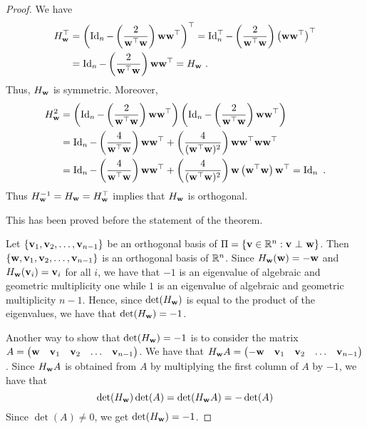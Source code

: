 \begin{proof}
 We have
\begin{align*}
  H_{\mathbf{w}}^\top &=
\left(\operatorname{Id}_n - \left(\frac{2}{\mathbf{w}^\top \mathbf{w}}\right)
  \mathbf{w} \mathbf{w}^\top \right)^\top
= \operatorname{Id}_n^\top - \left(\frac{2}{\mathbf{w}^\top \mathbf{w}}\right)
  \left( \mathbf{w} \mathbf{w}^\top \right)^\top \\
&=\operatorname{Id}_n - \left(\frac{2}{\mathbf{w}^\top \mathbf{w}}\right)
\mathbf{w} \mathbf{w}^\top = H_{\mathbf{w}} \ .
\end{align*}
Thus, $H_{\mathbf{w}}$ is symmetric.  Moreover,
\begin{align*}
H_{\mathbf{w}}^2 &= \left(\operatorname{Id}_n - \left(\frac{2}{\mathbf{w}^\top \mathbf{w}}\right)
\mathbf{w} \mathbf{w}^\top \right)
\left(\operatorname{Id}_n - \left(\frac{2}{\mathbf{w}^\top \mathbf{w}}\right)
  \mathbf{w} \mathbf{w}^\top \right) \\                
&= \operatorname{Id}_n - \left(\frac{4}{\mathbf{w}^\top \mathbf{w}}\right) \mathbf{w} \mathbf{w}^\top
+ \left(\frac{4}{(\mathbf{w}^\top \mathbf{w})^2}\right) \mathbf{w} \mathbf{w}^\top
\mathbf{w} \mathbf{w}^\top \\
&= \operatorname{Id}_n - \left(\frac{4}{\mathbf{w}^\top \mathbf{w}}\right) \mathbf{w} \mathbf{w}^\top
+ \left(\frac{4}{(\mathbf{w}^\top \mathbf{w})^2}\right)
\mathbf{w} \left( \mathbf{w}^\top \mathbf{w} \right) \mathbf{w}^\top = \operatorname{Id}_n \ .
\end{align*}
Thus $H_{\mathbf{w}}^{-1} = H_{\mathbf{w}} = H_{\mathbf{w}}^\top$ implies that
$H_{\mathbf{w}}$ is orthogonal.

  This has been proved before the statement of the theorem.

 Let $\{\mathbf{v}_1, \mathbf{v}_2, \ldots, \mathbf{v}_{n-1}\}$ be an
orthogonal basis of
$\Pi = \{ \mathbf{v} \in \mathbb{R}^n : \mathbf{v} \operatorname{\,\bot\,} \mathbf{w}\}$.  Then \\
$\{\mathbf{w}, \mathbf{v}_1, \mathbf{v}_2, \ldots, \mathbf{v}_{n-1}\}$ is an
orthogonal basis of $\mathbb{R}^n$.  Since $H_{\mathbf{w}}(\mathbf{w}) = -\mathbf{w}$
and $H_{\mathbf{w}}(\mathbf{v}_i) = \mathbf{v}_i$ for all $i$, we have that
$-1$ is an eigenvalue of algebraic and geometric multiplicity one
while $1$ is an eigenvalue of algebraic and geometric multiplicity
$n-1$.  Hence, since $\det(H_{\mathbf{w}})$ is equal to the product of the
eigenvalues, we have that $\det(H_{\mathbf{w}}) = -1$.

Another way to show that $\det(H_{\mathbf{w}}) = -1$ is to consider the
\nn matrix\\
$A = \begin{pmatrix} \mathbf{w} & \mathbf{v}_1 & \mathbf{v}_2 &
\ldots & \mathbf{v}_{n-1} \end{pmatrix}$.   We have that
$H_{\mathbf{w}} A = \begin{pmatrix} -\mathbf{w} & \mathbf{v}_1 & \mathbf{v}_2 &
\ldots & \mathbf{v}_{n-1} \end{pmatrix}$.   Since $H_{\mathbf{w}} A$ is
obtained from $A$ by multiplying the first column of $A$ by $-1$,
we have that
\[
\det(H_{\mathbf{w}}) \det(A) = \det(H_{\mathbf{w}} A) =  -\det(A)  
\]
Since $\det(A) \neq 0$, we get $\det(H_{\mathbf{w}}) = -1$.


\end{proof}
